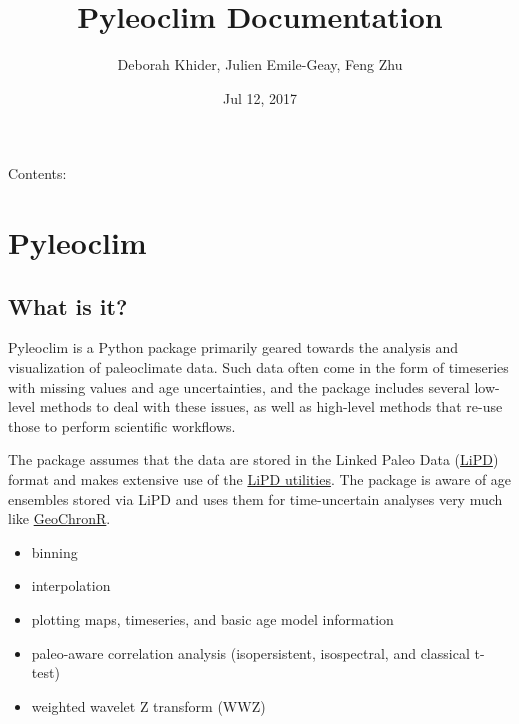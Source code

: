 \documentclass[letterpaper,10pt,english]{sphinxmanual}
\title{Pyleoclim Documentation}
\date{Jul 12, 2017}
\author{Deborah Khider, Julien Emile-Geay, Feng Zhu}
\begin{document}
\maketitle
\sphinxtableofcontents
{}\label{\detokenize{index::doc}}


Contents:


\chapter{Pyleoclim}
\label{\detokenize{Introduction:welcome-to-pyleoclim-s-documentation}}\label{\detokenize{Introduction::doc}}\label{\detokenize{Introduction:pyleoclim}}

\section{What is it?}
\label{\detokenize{Introduction:what-is-it}}
Pyleoclim is a Python package primarily geared towards the analysis and visualization of paleoclimate data.
Such data often come in the form of timeseries with missing values and age uncertainties, and the package
includes several low-level methods to deal with these issues, as well as high-level methods that re-use those
to perform scientific workflows.

The package assumes that the data are stored in the Linked Paleo Data (\href{http://www.clim-past.net/12/1093/2016/}{LiPD})
format and makes extensive use of the \href{http://nickmckay.github.io/LiPD-utilities/}{LiPD utilities}. The package
is aware of age ensembles stored via LiPD and uses them for time-uncertain analyses very much like \href{http://nickmckay.github.io/GeoChronR/}{GeoChronR}.

\begin{itemize}
\item {} 
binning

\item {} 
interpolation

\item {} 
plotting maps, timeseries, and basic age model information

\item {} 
paleo-aware correlation analysis (isopersistent, isospectral, and classical t-test)

\item {} 
weighted wavelet Z transform (WWZ)

\end{itemize}
\end{document}
